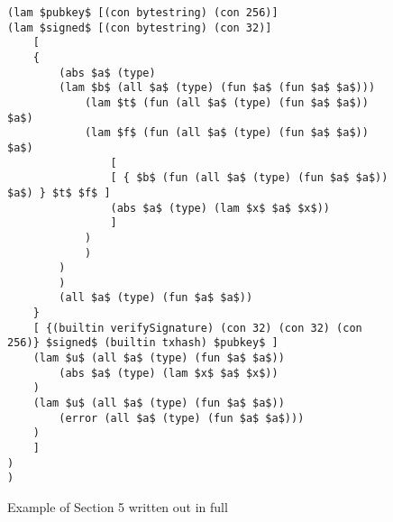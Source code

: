 \documentclass[../plutus-core-specification.tex]{subfiles}
\begin{document}
\begin{figure*}
\begin{lstlisting}[basicstyle=\ttfamily,mathescape]
(lam $pubkey$ [(con bytestring) (con 256)]
(lam $signed$ [(con bytestring) (con 32)]
    [ 
    {
        (abs $a$ (type)
        (lam $b$ (all $a$ (type) (fun $a$ (fun $a$ $a$)))
            (lam $t$ (fun (all $a$ (type) (fun $a$ $a$)) $a$)
            (lam $f$ (fun (all $a$ (type) (fun $a$ $a$)) $a$)
                [
                [ { $b$ (fun (all $a$ (type) (fun $a$ $a$)) $a$) } $t$ $f$ ]
                (abs $a$ (type) (lam $x$ $a$ $x$))
                ]
            )
            )
        )
        )
        (all $a$ (type) (fun $a$ $a$))
    }
    [ {(builtin verifySignature) (con 32) (con 32) (con 256)} $signed$ (builtin txhash) $pubkey$ ]
    (lam $u$ (all $a$ (type) (fun $a$ $a$))
        (abs $a$ (type) (lam $x$ $a$ $x$))
    )
    (lam $u$ (all $a$ (type) (fun $a$ $a$))
        (error (all $a$ (type) (fun $a$ $a$)))
    )
    ]
)
)
\end{lstlisting}
\caption{Example of Section 5 written out in full}
\label{fig:Continuized_Let_Example}
\end{figure*}
\end{document}
